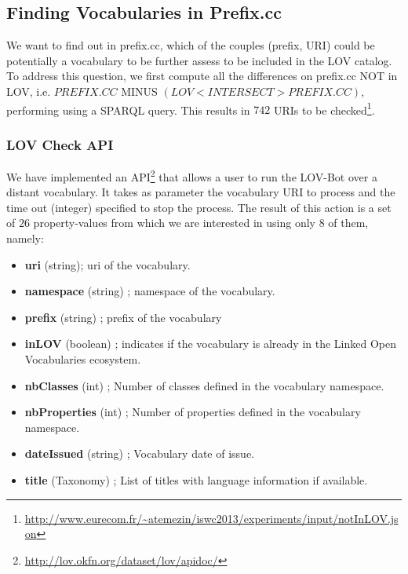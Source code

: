 \begin{description}

\subsection{Finding Vocabularies in Prefix.cc}   \label{sec:finding}
We want to find out in prefix.cc, which of the couples (prefix, URI) could be potentially a vocabulary to be further assess to be included in the LOV catalog. To address this question, we first compute all the differences on prefix.cc NOT in LOV, i.e. $PREFIX.CC$ MINUS $(LOV <INTERSECT> PREFIX.CC)$, performing using a SPARQL query. This results in $742$ URIs to be checked\footnote{\url{http://www.eurecom.fr/~atemezin/iswc2013/experiments/input/notInLOV.json}}.

\subsubsection{LOV Check API}
We have implemented an API\footnote{\url{http://lov.okfn.org/dataset/lov/apidoc/}} that allows a user to run the LOV-Bot over a distant vocabulary. It takes as parameter the vocabulary URI to process and the time out (integer) specified to stop the process. The result of this action is a set of $26$ property-values from which we are interested in using only $8$ of them, namely:
\begin{itemize}
 \item \textbf{uri} (string); uri of the vocabulary.
 \item \textbf{namespace} (string) ; namespace of the vocabulary.
 \item {\textbf{prefix} (string) ;  prefix of the vocabulary}
 \item{\textbf{inLOV} (boolean) ; indicates if the vocabulary is already in the Linked Open Vocabularies ecosystem}.
 \item {\textbf{nbClasses} (int) ; Number of classes defined in the vocabulary namespace}.
 \item{\textbf{nbProperties} (int) ; Number of properties defined in the vocabulary namespace}.
 \item{\textbf{dateIssued }(string) ; Vocabulary date of issue}.
 \item{\textbf{title} (Taxonomy) ; List of titles with language information if available}.
\end{itemize}


\end{description}

